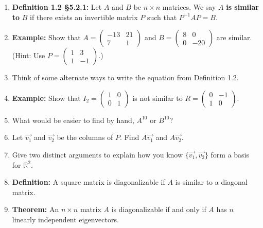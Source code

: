 \documentclass[11pt,fleqn]{article}
\begin{document}
\renewcommand{\headrulewidth}{0pt}
\newcommand{\blank}[1]{\rule{#1}{0.75pt}}
\renewcommand{\d}{\displaystyle}

\newcommand{\bpm}{\begin{pmatrix}}
\newcommand{\epm}{\end{pmatrix}}
\newcommand{\bbm}{\begin{bmatrix}}
\newcommand{\ebm}{\end{bmatrix}}

\vspace*{-0.7in}

\begin{center}
  \large {} \end{center}
 \begin{enumerate}
 \item \textbf{Definition 1.2 \S 5.2.1:} Let $A$ and $B$ be $n \times n$ matrices. We say $A$ \textbf{is similar to} $B$ if there exists an invertible matrix $P$ such that $P^{-1}AP=B.$

\item \textbf{Example:} Show that $A=\bpm -13&21\\7&1\epm$ and $B=\bpm 8&0\\0&-20\epm$ are similar. (Hint: Use $P=\bpm 1&3\\1&-1\epm.$)

\vfill

\item Think of some alternate ways to write the equation from Definition 1.2.\\
\vspace{1in}

\item  \textbf{Example:}  Show that $I_2=\bpm 1&0\\0&1 \epm$ is not similar to $R=\bpm 0&-1\\1&0 \epm.$
\vfill
 
 \item What would be easier to find by hand,  $A^{10}$ or $B^{10}$?
 \vfill
 \item Let $\vec{v_1}$ and $\vec{v_2}$ be the columns of $P$. Find $A\vec{v_1}$ and $A\vec{v_2}.$
 \vfill
 \item Give two distinct arguments to explain how you know $\{ \vec{v_1}, \vec{v_2}\}$ form a basis for $\mathbb{R}^2.$
 \vfill
 \item \textbf{Definition:} A square matrix is diagonalizable if $A$ is similar to a diagonal matrix.
 \newpage
 \item \textbf{Theorem:} An $n \times n$ matrix $A$ is diagonalizable if and only if $A$ has $n$ linearly independent eigenvectors.\\
 

\end{enumerate}
\end{document}

